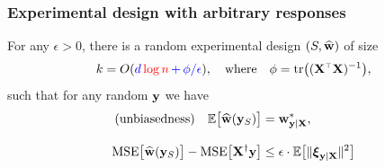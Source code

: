\documentclass{beamer}
\begin{document}
  \begin{frame}
    \frametitle{Experimental design with arbitrary responses}
    \begin{theorem}
For any $\epsilon>0$, there is a random experimental design $(S,\widehat{\mathbf w})$
of size
\[k=O(\Blue{d}\,\Red{\log n}\Blue{\,+\,\phi/\epsilon}), \quad\text{where}\quad\phi=\tr\big((\X^\top\X)^{-1}\big),\]
such that for any random $\mathbf y$ we have
\begin{align*}
\text{(unbiasedness)}\quad  \E\big[\wbh(\y_S)\big]&= \w^*_{\y|\X},\\[3mm]
\mathrm{MSE}\big[\wbh(\y_S)\big] - \mathrm{MSE}\big[\X^\dagger\y\big]
  &\leq \epsilon\cdot 
  \E\big[\|\xib_{\y|\X}\|^2\big]%
\end{align*}
\end{theorem}

  
\end{frame}
\end{document}
